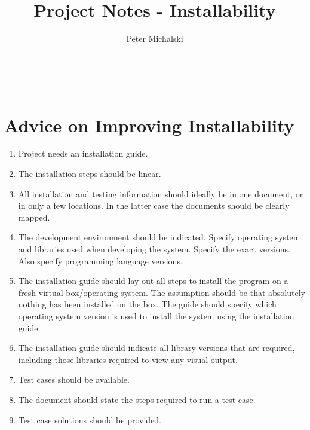 \documentclass{article}
\title{Project Notes - Installability}
\author{Peter Michalski}
\date{}
\begin{document}
\maketitle

~\newpage
\section{Advice on Improving Installability}

\begin{enumerate}
	\item Project needs an installation guide.
	\item The installation steps should be linear.
	\item All installation and testing information should ideally be in one document, or in only a few locations. In the latter case the documents should be clearly mapped.
	\item The development environment should be indicated. Specify operating system and libraries used when developing the system. Specify the exact versions. Also specify programming language versions.
	\item The installation guide should lay out all steps to install the program on a fresh virtual box/operating system. The assumption should be that absolutely nothing has been installed on the box. The guide should specify which operating system version is used to install the system using the installation guide. 
	\item The installation guide should indicate all library versions that are required, including those libraries required to view any visual output.
	\item Test cases should be available.
	\item The document should state the steps required to run a test case. 
	\item Test case solutions should be provided. 
\end{enumerate}
\end{document}
